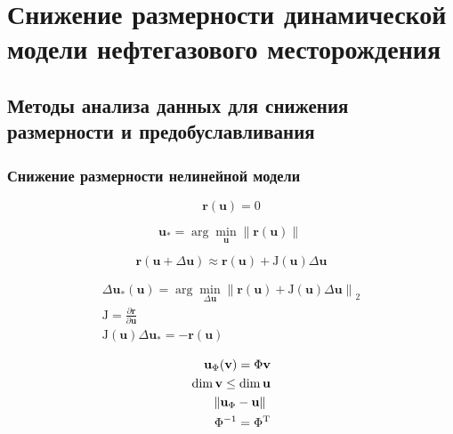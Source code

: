\chapter{Снижение размерности динамической модели нефтегазового месторождения}\label{ch:ch2}




\section{Методы анализа данных для снижения размерности и предобуславливания}

\subsection{Снижение размерности нелинейной модели}

\newcommand{\bvec}[1]{\mathbf{#1}}
\newcommand{\resid}{\bvec{r}}
\newcommand{\unk}{\bvec{u}}
\newcommand{\jac}{\mathrm{J}}
\newcommand{\dunk}{\Delta \unk}
\newcommand{\vunk}{\bvec{v}}
\newcommand{\matr}[1]{\mathrm{\uppercase{#1}}}
\newcommand{\norm}[2][~]{\left\| #2  \right\|_{#1}}
\newcommand{\transpose}[1]{\matr{#1}^\mathrm{T}}
\newcommand{\dvunk}{\Delta \vunk}
\newcommand{\deriv}[2]{\frac{\partial #1}{\partial #2}}
\newcommand{\pc}[1][~]{\bvec{\varphi}_{#1}}
\newcommand{\param}{\bvec{\mu}}
\newcommand{\nlin}{\bvec{\eta}}

\begin{equation}
   \resid(\unk) = 0
\end{equation}

\begin{equation}
    \unk_\ast = \arg \min_{\unk} \norm{\resid(\unk)}
\end{equation}

\begin{equation}
    \resid(\unk + \Delta \unk) \approx \resid(\unk) + \jac(\unk) \dunk
\end{equation}

\begin{align}
    \dunk_\ast (\unk) = \arg \min_{\dunk} \norm[2]{\resid(\unk) + \jac(\unk) \dunk} \\
    \jac = \deriv{\resid}{\unk} \\
    \jac(\unk) \dunk_\ast = - \resid(\unk)
\end{align}

\begin{align}
    \unk_\Phi (\vunk) = \Phi \vunk \\
    \dim{\vunk} \leq \dim{\unk} \\
    \norm{\unk_\Phi - \unk} \\
    \Phi^{-1} = \transpose{\Phi}
\end{align}

